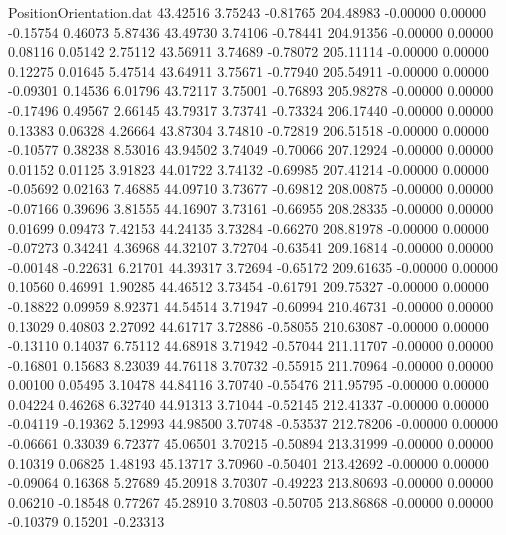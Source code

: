 \begin{filecontents}{PositionOrientation.dat}
  43.42516    3.75243   -0.81765   204.48983   -0.00000    0.00000   -0.15754    0.46073    5.87436
  43.49730    3.74106   -0.78441   204.91356   -0.00000    0.00000    0.08116    0.05142    2.75112
  43.56911    3.74689   -0.78072   205.11114   -0.00000    0.00000    0.12275    0.01645    5.47514
  43.64911    3.75671   -0.77940   205.54911   -0.00000    0.00000   -0.09301    0.14536    6.01796
  43.72117    3.75001   -0.76893   205.98278   -0.00000    0.00000   -0.17496    0.49567    2.66145
  43.79317    3.73741   -0.73324   206.17440   -0.00000    0.00000    0.13383    0.06328    4.26664
  43.87304    3.74810   -0.72819   206.51518   -0.00000    0.00000   -0.10577    0.38238    8.53016
  43.94502    3.74049   -0.70066   207.12924   -0.00000    0.00000    0.01152    0.01125    3.91823
  44.01722    3.74132   -0.69985   207.41214   -0.00000    0.00000   -0.05692    0.02163    7.46885
  44.09710    3.73677   -0.69812   208.00875   -0.00000    0.00000   -0.07166    0.39696    3.81555
  44.16907    3.73161   -0.66955   208.28335   -0.00000    0.00000    0.01699    0.09473    7.42153
  44.24135    3.73284   -0.66270   208.81978   -0.00000    0.00000   -0.07273    0.34241    4.36968
  44.32107    3.72704   -0.63541   209.16814   -0.00000    0.00000   -0.00148   -0.22631    6.21701
  44.39317    3.72694   -0.65172   209.61635   -0.00000    0.00000    0.10560    0.46991    1.90285
  44.46512    3.73454   -0.61791   209.75327   -0.00000    0.00000   -0.18822    0.09959    8.92371
  44.54514    3.71947   -0.60994   210.46731   -0.00000    0.00000    0.13029    0.40803    2.27092
  44.61717    3.72886   -0.58055   210.63087   -0.00000    0.00000   -0.13110    0.14037    6.75112
  44.68918    3.71942   -0.57044   211.11707   -0.00000    0.00000   -0.16801    0.15683    8.23039
  44.76118    3.70732   -0.55915   211.70964   -0.00000    0.00000    0.00100    0.05495    3.10478
  44.84116    3.70740   -0.55476   211.95795   -0.00000    0.00000    0.04224    0.46268    6.32740
  44.91313    3.71044   -0.52145   212.41337   -0.00000    0.00000   -0.04119   -0.19362    5.12993
  44.98500    3.70748   -0.53537   212.78206   -0.00000    0.00000   -0.06661    0.33039    6.72377
  45.06501    3.70215   -0.50894   213.31999   -0.00000    0.00000    0.10319    0.06825    1.48193
  45.13717    3.70960   -0.50401   213.42692   -0.00000    0.00000   -0.09064    0.16368    5.27689
  45.20918    3.70307   -0.49223   213.80693   -0.00000    0.00000    0.06210   -0.18548    0.77267
  45.28910    3.70803   -0.50705   213.86868   -0.00000    0.00000   -0.10379    0.15201   -0.23313

\end{filecontents}
